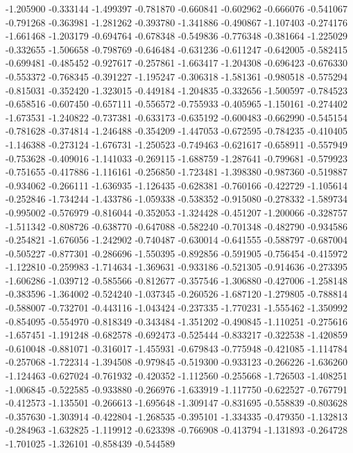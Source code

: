 -1.205900
-0.333144
-1.499397
-0.781870
-0.660841
-0.602962
-0.666076
-0.541067
-0.791268
-0.363981
-1.281262
-0.393780
-1.341886
-0.490867
-1.107403
-0.274176
-1.661468
-1.203179
-0.694764
-0.678348
-0.549836
-0.776348
-0.381664
-1.225029
-0.332655
-1.506658
-0.798769
-0.646484
-0.631236
-0.611247
-0.642005
-0.582415
-0.699481
-0.485452
-0.927617
-0.257861
-1.663417
-1.204308
-0.696423
-0.676330
-0.553372
-0.768345
-0.391227
-1.195247
-0.306318
-1.581361
-0.980518
-0.575294
-0.815031
-0.352420
-1.323015
-0.449184
-1.204835
-0.332656
-1.500597
-0.784523
-0.658516
-0.607450
-0.657111
-0.556572
-0.755933
-0.405965
-1.150161
-0.274402
-1.673531
-1.240822
-0.737381
-0.633173
-0.635192
-0.600483
-0.662990
-0.545154
-0.781628
-0.374814
-1.246488
-0.354209
-1.447053
-0.672595
-0.784235
-0.410405
-1.146388
-0.273124
-1.676731
-1.250523
-0.749463
-0.621617
-0.658911
-0.557949
-0.753628
-0.409016
-1.141033
-0.269115
-1.688759
-1.287641
-0.799681
-0.579923
-0.751655
-0.417886
-1.116161
-0.256850
-1.723481
-1.398380
-0.987360
-0.519887
-0.934062
-0.266111
-1.636935
-1.126435
-0.628381
-0.760166
-0.422729
-1.105614
-0.252846
-1.734244
-1.433786
-1.059338
-0.538352
-0.915080
-0.278332
-1.589734
-0.995002
-0.576979
-0.816044
-0.352053
-1.324428
-0.451207
-1.200066
-0.328757
-1.511342
-0.808726
-0.638770
-0.647088
-0.582240
-0.701348
-0.482790
-0.934586
-0.254821
-1.676056
-1.242902
-0.740487
-0.630014
-0.641555
-0.588797
-0.687004
-0.505227
-0.877301
-0.286696
-1.550395
-0.892856
-0.591905
-0.756454
-0.415972
-1.122810
-0.259983
-1.714634
-1.369631
-0.933186
-0.521305
-0.914636
-0.273395
-1.606286
-1.039712
-0.585566
-0.812677
-0.357546
-1.306880
-0.427006
-1.258148
-0.383596
-1.364002
-0.524240
-1.037345
-0.260526
-1.687120
-1.279805
-0.788814
-0.588007
-0.732701
-0.443116
-1.043424
-0.237335
-1.770231
-1.555462
-1.350992
-0.854095
-0.554970
-0.818349
-0.343484
-1.351202
-0.490845
-1.110251
-0.275616
-1.657451
-1.191248
-0.682578
-0.692473
-0.525444
-0.833217
-0.322538
-1.420859
-0.610048
-0.881071
-0.316017
-1.455931
-0.679843
-0.775948
-0.421085
-1.114784
-0.257068
-1.722314
-1.394508
-0.979845
-0.519300
-0.933123
-0.266226
-1.636260
-1.124463
-0.627024
-0.761932
-0.420352
-1.112560
-0.255668
-1.726503
-1.408251
-1.006845
-0.522585
-0.933880
-0.266976
-1.633919
-1.117750
-0.622527
-0.767791
-0.412573
-1.135501
-0.266613
-1.695648
-1.309147
-0.831695
-0.558839
-0.803628
-0.357630
-1.303914
-0.422804
-1.268535
-0.395101
-1.334335
-0.479350
-1.132813
-0.284963
-1.632825
-1.119912
-0.623398
-0.766908
-0.413794
-1.131893
-0.264728
-1.701025
-1.326101
-0.858439
-0.544589
